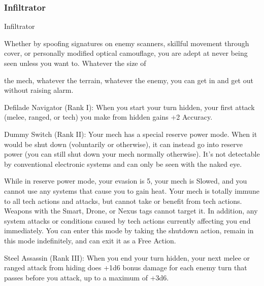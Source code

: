 \subsubsection{Infiltrator}

                                                    Infiltrator

Whether by spoofing signatures on enemy scanners, skillful movement through cover, or personally
modified optical camouflage, you are adept at never being seen unless you want to. Whatever the size of

the mech, whatever the terrain, whatever the enemy, you can get in and get out without raising alarm.




Defilade Navigator (Rank I): When you start your turn hidden, your first attack (melee, ranged,
or tech) you make from hidden gains +2 Accuracy.

Dummy Switch (Rank II): Your mech has a special reserve power mode. When it would be shut
down (voluntarily or otherwise), it can instead go into reserve power (you can still shut down your
mech normally otherwise). It’s not detectable by conventional electronic systems and can only be
seen with the naked eye.

While in reserve power mode, your evasion is 5, your mech is Slowed, and you cannot use any
systems that cause you to gain heat. Your mech is totally immune to all tech actions and attacks,
but cannot take or benefit from tech actions. Weapons with the Smart, Drone, or Nexus tags
cannot target it. In addition, any system attacks or conditions caused by tech actions currently
affecting you end immediately. You can enter this mode by taking the shutdown action, remain in
this mode indefinitely, and can exit it as a Free Action.

Steel Assassin (Rank III): When you end your turn hidden, your next melee or ranged attack
from hiding does +1d6 bonus damage for each enemy turn that passes before you attack, up to
a maximum of +3d6.